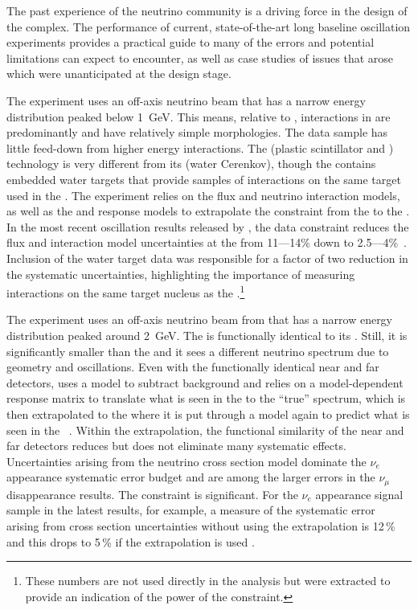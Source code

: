 The past experience of the neutrino community is a driving force in the design of the    complex. 
The performance of  current, state-of-the-art long baseline oscillation experiments  provides a practical guide to many of the errors and potential limitations  can expect to encounter, as well as case studies of issues that arose which were unanticipated at the design stage. 

The  experiment uses an off-axis neutrino beam that has a narrow energy distribution peaked below \SI{1}{GeV}. This means, relative to , interactions in  are predominantly  and have relatively simple morphologies.  The data sample has little feed-down from higher energy interactions.  The    (plastic scintillator and
 ) technology is very different from its    (water Cerenkov), though the  contains embedded water targets that provide samples of interactions on the same target used in the .
The experiment relies on the flux and neutrino interaction models, as well as the  and   response models to extrapolate the constraint from the   to the  .   In the most recent oscillation results released by , the   data constraint reduces the flux and interaction model uncertainties at the   from 11---14\% down to 2.5---4\%~\cite{Abe:2018wpn}. Inclusion of the water target data was responsible for a factor of two reduction in the systematic uncertainties, highlighting the importance of measuring interactions on the same target nucleus as the .\footnote{These numbers are not used directly in the analysis but were extracted to provide an indication of the power of the  constraint.}

The    experiment uses an off-axis neutrino beam from  that has a narrow energy distribution peaked around \SI{2}{GeV}.  The      is functionally identical to its  .  Still, it is significantly smaller than the   and it sees a different neutrino spectrum due to geometry and oscillations.  Even with the functionally identical near and  far detectors,    uses a model to subtract  background and relies on a model-dependent response matrix to translate what is seen in the   to the ``true'' spectrum, which is then extrapolated to the   where it is put through a model again to predict what is seen in the  ~\cite{NOvA:2018gge, WolcottNUINT2018}.  Within the extrapolation, the functional similarity of the near and  far detectors reduces but does not eliminate many systematic effects.  Uncertainties arising from the neutrino cross section model dominate the    $\nu_{e}$ appearance systematic error budget and are among the larger errors in the $\nu_{\mu}$ disappearance results.  The   constraint is significant.  For the $\nu_{e}$ appearance signal sample in the latest    results, for example, a measure of the systematic error arising from cross section uncertainties without using the   extrapolation is 12\,\% and this drops to 5\,\% if the   extrapolation is used \cite{WolcottNUINT2018}.

